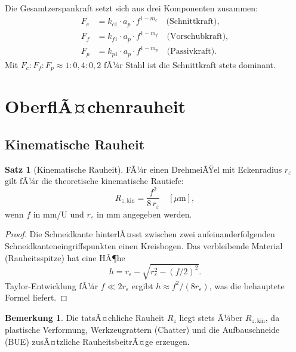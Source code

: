 ﻿\documentclass[a4paper,12pt]{article}
\theoremstyle{definition}
\newtheorem{satz}{Satz}
\newtheorem{bemerkung}{Bemerkung}
\begin{document}
Die Gesamtzerspankraft setzt sich aus drei Komponenten zusammen:
\begin{align}
  F_c &= k_{c1} \cdot a_p \cdot f^{1-m_c} \quad \text{(Schnittkraft)}, \\
  F_f &= k_{f1} \cdot a_p \cdot f^{1-m_f} \quad \text{(Vorschubkraft)}, \\
  F_p &= k_{p1} \cdot a_p \cdot f^{1-m_p} \quad \text{(Passivkraft)}.
\end{align}
Mit $F_c : F_f : F_p \approx 1 : 0{,}4 : 0{,}2$ fÃ¼r Stahl ist die Schnittkraft
stets dominant.

\section{OberflÃ¤chenrauheit}
\label{sec:rauheit}

\subsection{Kinematische Rauheit}

\begin{satz}[Kinematische Rauheit]
\label{satz:rauheit}
  FÃ¼r einen DrehmeiÃŸel mit Eckenradius $r_\varepsilon$ gilt fÃ¼r die
  theoretische kinematische Rautiefe:
  \[
    R_{z,\mathrm{kin}} = \frac{f^2}{8 \, r_\varepsilon} \quad [\mu\mathrm{m}],
  \]
  wenn $f$ in mm/U und $r_\varepsilon$ in mm angegeben werden.
\end{satz}

\begin{proof}
  Die Schneidkante hinterlÃ¤sst zwischen zwei aufeinanderfolgenden Schneidkanteneingriffspunkten
  einen Kreisbogen. Das verbleibende Material (Rauheitsspitze) hat eine HÃ¶he
  \[
    h = r_\varepsilon - \sqrt{r_\varepsilon^2 - (f/2)^2}.
  \]
  Taylor-Entwicklung fÃ¼r $f \ll 2r_\varepsilon$ ergibt
  $h \approx f^2 / (8 r_\varepsilon)$, was die behauptete Formel liefert. \qedhere
\end{proof}

\begin{bemerkung}
  Die tatsÃ¤chliche Rauheit $R_z$ liegt stets Ã¼ber $R_{z,\mathrm{kin}}$, da
  plastische Verformung, Werkzeugrattern (Chatter) und die Aufbauschneide
  (BUE) zusÃ¤tzliche RauheitsbeitrÃ¤ge erzeugen.
\end{bemerkung}
\end{document}
